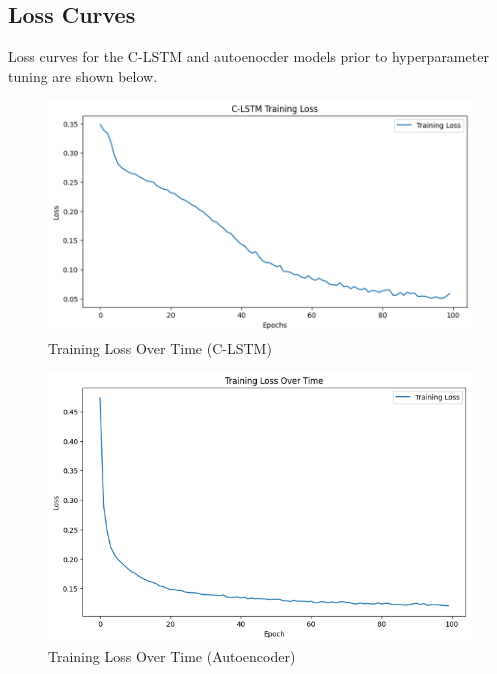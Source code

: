 \documentclass[10pt,twocolumn,letterpaper]{article}
\begin{document}
\begin{appendices}
\section{Loss Curves}
\normalsize
Loss curves for the C-LSTM and autoenocder models prior to hyperparameter tuning are shown below.
\begin{figure}[htbp]
   \centering
   \includegraphics[width=\linewidth]{images/C-LSTM_loss.png}
   \caption{Training Loss Over Time (C-LSTM)}
   \label{fig:c_lstm_training_loss}
   \end{figure}
   
   \begin{figure}[htbp]
   \centering
   \includegraphics[width=\linewidth]{images/autoenc_loss.png}
   \caption{Training Loss Over Time (Autoencoder)}
   \label{fig:autoencoder_training_loss}
   \end{figure}
   
   
\end{appendices}
\end{document}
